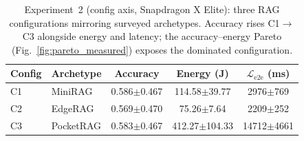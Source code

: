 \begin{table}[t]
\centering
\caption{Experiment~2 (config axis, Snapdragon X Elite): three RAG configurations mirroring surveyed archetypes. Accuracy rises C1$\rightarrow$C3 alongside energy and latency; the accuracy--energy Pareto (Fig.~\ref{fig:pareto_measured}) exposes the dominated configuration.}
\label{tab:config}
\small
\begin{tabular}{llccc}
\toprule
Config & Archetype & Accuracy & Energy (J) & $\mathcal{L}_\text{e2e}$ (ms) \\
\midrule
C1 & MiniRAG & 0.586$\pm$0.467 & 114.58$\pm$39.77 & 2976$\pm$769 \\
C2 & EdgeRAG & 0.569$\pm$0.470 & 75.26$\pm$7.64 & 2209$\pm$252 \\
C3 & PocketRAG & 0.583$\pm$0.467 & 412.27$\pm$104.33 & 14712$\pm$4661 \\
\bottomrule
\end{tabular}
\end{table}